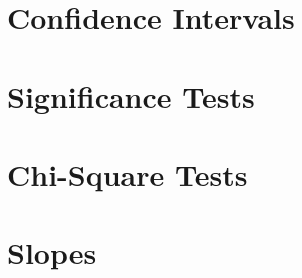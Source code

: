 \documentclass[../AP_Statistics.tex]{subfiles}
\begin{document}
	\chapter{Confidence Intervals}
	\chapter{Significance Tests}
	\chapter{Chi-Square Tests}
	\chapter{Slopes}
\end{document}
